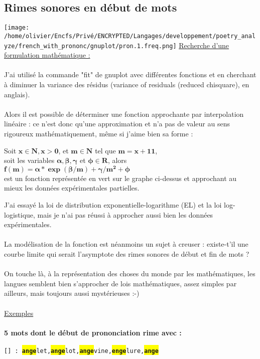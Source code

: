 \documentclass[french]{article}
\begin{document}
\subsection{Rimes sonores en début de mots}
\texttt{[image: /home/olivier/Encfs/Privé/ENCRYPTED/Langages/developpement/poetry\_analyze/french\_with\_prononc/gnuplot/pron.1.freq.png]}
\underline{Recherche d'une formulation mathématique :}\\
\\
J'ai utilisé la commande "fit" de gnuplot avec différentes fonctions et en cherchant à diminuer la variance des résidus (variance of residuals (reduced chisquare), en anglais).\\
\\
Alors il est possible de déterminer une fonction approchante par interpolation linéaire : ce n'est donc qu'une approximation et n'a pas de valeur au sens rigoureux mathématiquement, même si j'aime bien sa forme :\\
\begin{center}
Soit $ \mathbf{x \in N, x > 0} $, et $ \mathbf{m \in N} $ tel que $ \mathbf{m = x + 11} $,\\
soit les variables $ \mathbf{\alpha, \beta, \gamma} $ et $ \mathbf{\phi \in R} $, alors\\
$ \mathbf{f(m) = \alpha * \exp(\beta/m) + \gamma / m^2 + \phi} $\\
est un fonction représentée en vert sur le graphe ci-dessus et approchant au mieux les données expérimentales partielles.\\
\end{center}
J'ai essayé la loi de distribution exponentielle-logarithme (EL) et la loi log-logistique, mais je n'ai pas réussi à approcher aussi bien les données expérimentales.\\
\\
La modélisation de la fonction est néanmoins un sujet à creuser : existe-t'il une courbe limite qui serait l'asymptote des rimes sonores de début et fin de mots ?\\
\\
On touche là, à la représentation des choses du monde par les mathématiques, les langues semblent bien s'approcher de lois mathématiques, assez simples par ailleurs, mais toujours aussi mystérieuses :-)\\
\\
\underline{Exemples}
\paragraph{5 mots dont le début de prononciation rime avec :\\}
\texttt{[\colorbox{blue}{}] : \colorbox{yellow}{\textbf{ange}}let,\colorbox{yellow}{\textbf{ange}}lot,\colorbox{yellow}{\textbf{ange}}vine,\colorbox{yellow}{\textbf{enge}}lure,\colorbox{yellow}{\textbf{ange}}}\\
\end{document}
